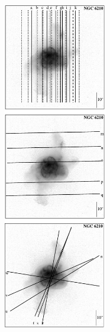 \documentclass[useAMS, usenatbib]{mnras}
\begin{document}
\begin{figure}
\centering
  \includegraphics[width=0.4\textwidth]{tere-figs/Figure2a}
  \caption{ }
\end{figure}
\end{document}
